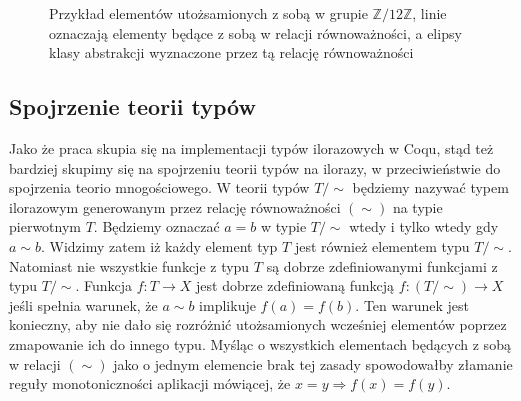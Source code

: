 \begin{figure}[!htp]
    \centering
    \caption{Przykład elementów utożsamionych z sobą w grupie $\mathbb{Z} / 12\mathbb{Z}$, linie oznaczają elementy będące z sobą w relacji równoważności, a elipsy klasy abstrakcji wyznaczone przez tą relację równoważności}
    \label{fig:fourier_vis}
\end{figure}


\subsection{Spojrzenie teorii typów}
Jako że praca skupia się na implementacji typów ilorazowych w Coqu, stąd też bardziej skupimy się na spojrzeniu teorii typów na ilorazy, w przeciwieństwie do spojrzenia teorio mnogościowego. W teorii typów $T/\sim$ będziemy nazywać typem ilorazowym generowanym przez relację równoważności $(\sim)$ na typie pierwotnym $T$. Będziemy oznaczać $a = b$ w typie $T/\sim$ wtedy i tylko wtedy gdy $a \sim b$. Widzimy zatem iż każdy element typ $T$ jest również elementem typu $T/\sim$. Natomiast nie wszystkie funkcje z typu $T$ są dobrze zdefiniowanymi funkcjami z typu $T/\sim$. Funkcja $f: T \rightarrow X$ jest dobrze zdefiniowaną funkcją $f: (T/\sim) \rightarrow X$ jeśli spełnia warunek, że $a \sim b$ implikuje $f(a) = f(b)$. Ten warunek jest konieczny, aby nie dało się rozróżnić utożsamionych wcześniej elementów poprzez zmapowanie ich do innego typu. Myśląc o wszystkich elementach będących z sobą w relacji $(\sim)$ jako o jednym elemencie brak tej zasady spowodowałby złamanie reguły monotoniczności aplikacji mówiącej, że $x = y \Rightarrow f (x) = f (y)$.
